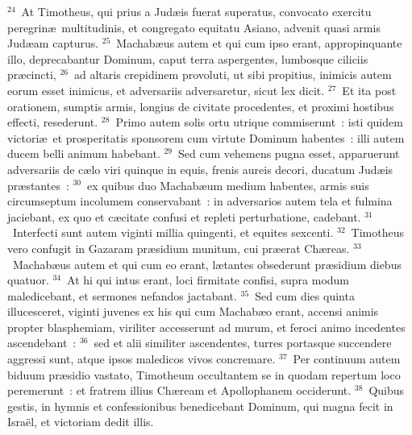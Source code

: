 ${}^{24}$~At Timotheus, qui prius a Jud\ae is fuerat superatus, convocato exercitu peregrin\ae\ multitudinis, et congregato equitatu Asiano, advenit quasi armis Jud\ae am capturus.
${}^{25}$~Machab\ae us autem et qui cum ipso erant, appropinquante illo, deprecabantur Dominum, caput terra aspergentes, lumbosque ciliciis pr\ae cincti,
${}^{26}$~ad altaris crepidinem provoluti, ut sibi propitius, inimicis autem eorum esset inimicus, et adversariis adversaretur, sicut lex dicit.
${}^{27}$~Et ita post orationem, sumptis armis, longius de civitate procedentes, et proximi hostibus effecti, resederunt.
${}^{28}$~Primo autem solis ortu utrique commiserunt~: isti quidem victori\ae\ et prosperitatis sponsorem cum virtute Dominum habentes~: illi autem ducem belli animum habebant.
${}^{29}$~Sed cum vehemens pugna esset, apparuerunt adversariis de c\ae lo viri quinque in equis, frenis aureis decori, ducatum Jud\ae is pr\ae stantes~:
${}^{30}$~ex quibus duo Machab\ae um medium habentes, armis suis circumseptum incolumem conservabant~: in adversarios autem tela et fulmina jaciebant, ex quo et c\ae citate confusi et repleti perturbatione, cadebant.
${}^{31}$~Interfecti sunt autem viginti millia quingenti, et equites sexcenti.
${}^{32}$~Timotheus vero confugit in Gazaram pr\ae sidium munitum, cui pr\ae erat Ch\ae reas.
${}^{33}$~Machab\ae us autem et qui cum eo erant, l\ae tantes obsederunt pr\ae sidium diebus quatuor.
${}^{34}$~At hi qui intus erant, loci firmitate confisi, supra modum maledicebant, et sermones nefandos jactabant.
${}^{35}$~Sed cum dies quinta illucesceret, viginti juvenes ex his qui cum Machab\ae o erant, accensi animis propter blasphemiam, viriliter accesserunt ad murum, et feroci animo incedentes ascendebant~:
${}^{36}$~sed et alii similiter ascendentes, turres portasque succendere aggressi sunt, atque ipsos maledicos vivos concremare.
${}^{37}$~Per continuum autem biduum pr\ae sidio vastato, Timotheum occultantem se in quodam repertum loco peremerunt~: et fratrem illius Ch\ae ream et Apollophanem occiderunt.
${}^{38}$~Quibus gestis, in hymnis et confessionibus benedicebant Dominum, qui magna fecit in Isra\"el, et victoriam dedit illis.

